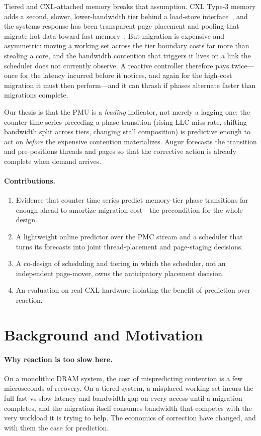 \documentclass[sigconf,nonacm]{acmart}
\begin{document}
Tiered and CXL-attached memory breaks that assumption. CXL Type-3 memory adds a
second, slower, lower-bandwidth tier behind a load-store
interface~\cite{cxl-spec}, and the systems response has been transparent page
placement and pooling that migrate hot data toward fast
memory~\cite{maruf2023tpp,li2023pond}. But migration is expensive and
asymmetric: moving a working set across the tier boundary costs far more than
stealing a core, and the bandwidth contention that triggers it lives on a link
the scheduler does not currently observe. A reactive controller therefore pays
twice---once for the latency incurred before it notices, and again for the
high-cost migration it must then perform---and it can thrash if phases alternate
faster than migrations complete.

Our thesis is that the PMU is a \emph{leading} indicator, not merely a lagging
one: the counter time series preceding a phase transition (rising LLC miss rate,
shifting bandwidth split across tiers, changing stall composition) is predictive
enough to act on \emph{before} the expensive contention materializes. Augur
forecasts the transition and pre-positions threads and pages so that the
corrective action is already complete when demand arrives.

\paragraph{Contributions.}
\begin{enumerate}
\item Evidence that counter time series predict memory-tier phase transitions far
enough ahead to amortize migration cost---the precondition for the whole design.
\item A lightweight online predictor over the PMC stream and a scheduler that
turns its forecasts into joint thread-placement and page-staging decisions.
\item A co-design of scheduling and tiering in which the scheduler, not an
independent page-mover, owns the anticipatory placement decision.
\item An evaluation on real CXL hardware isolating the benefit of prediction over
reaction.
\end{enumerate}

\section{Background and Motivation}
\paragraph{Why reaction is too slow here.}
On a monolithic DRAM system, the cost of mispredicting contention is a few
microseconds of recovery. On a tiered system, a misplaced working set incurs the
full fast-vs-slow latency and bandwidth gap on every access until a migration
completes, and the migration itself consumes bandwidth that competes with the
very workload it is trying to help. The economics of correction have changed, and
with them the case for prediction.
\end{document}
